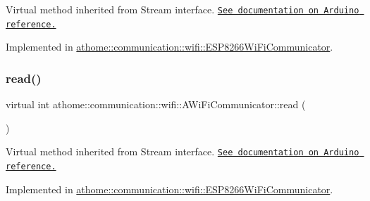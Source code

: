 Virtual method inherited from Stream interface. \href{https://www.arduino.cc/reference/en/language/functions/communication/stream/streampeek/}{\tt See documentation on Arduino reference.} 

Implemented in \mbox{\hyperlink{classathome_1_1communication_1_1wifi_1_1_e_s_p8266_wi_fi_communicator_affeb5491ad5c97fa53a683926f8184d2}{athome\+::communication\+::wifi\+::\+E\+S\+P8266\+Wi\+Fi\+Communicator}}.

\mbox{\label{classathome_1_1communication_1_1wifi_1_1_a_wi_fi_communicator_ac18a51bba1651031d4ea2ac2d2a19606}} 
\subsubsection{\texorpdfstring{read()}{read()}}
{\footnotesize\ttfamily virtual int athome\+::communication\+::wifi\+::\+A\+Wi\+Fi\+Communicator\+::read (\begin{DoxyParamCaption}{ }\end{DoxyParamCaption})\hspace{0.3cm}{\ttfamily [pure virtual]}}

Virtual method inherited from Stream interface. \href{https://www.arduino.cc/reference/en/language/functions/communication/stream/streamread/}{\tt See documentation on Arduino reference.} 

Implemented in \mbox{\hyperlink{classathome_1_1communication_1_1wifi_1_1_e_s_p8266_wi_fi_communicator_a1cadc570e912c164279ef0ebc5b178a5}{athome\+::communication\+::wifi\+::\+E\+S\+P8266\+Wi\+Fi\+Communicator}}.

\mbox{\label{classathome_1_1communication_1_1wifi_1_1_a_wi_fi_communicator_a2b802d934022436e029fc31b3e84d321}} 

